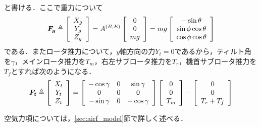 と書ける．ここで重力について
\begin{equation}
  \mbox{\boldmath $F_g$} \triangleq
  \left[
  \begin{array}{ccc}
    X_g \\
    Y_g \\
    Z_g
  \end{array}
  \right] =
  A^{(B,E)}
  \left[
  \begin{array}{ccc}
    0 \\
    0 \\
    mg
  \end{array}
  \right] = mg
  \left[
  \begin{array}{ccc}
    -\sin\theta \\
    \sin\phi\cos\theta \\
    \cos\phi\cos\theta
  \end{array}
  \right]
  \label{eq:F_g}
\end{equation}
である．またロータ推力について，$y$軸方向の力$Y_t=0$であるから，ティルト角を$\gamma$，メインロータ推力を$T_m$，右左サブロータ推力を$T_r$，機首サブロータ推力を$T_f$とすれば次のようになる．
\begin{equation}
  \mbox{\boldmath $F_t$} \triangleq
  \left[
    \begin{array}{ccc}
      X_t \\
      Y_t \\
      Z_t
    \end{array}
  \right] =
  \left[
    \begin{array}{ccc}
      -\cos\gamma & 0 & \sin\gamma \\
      0 & 0 & 0 \\
      -\sin\gamma & 0 & -\cos\gamma
    \end{array}
  \right]
  \left[
    \begin{array}{ccc}
      0 \\
      0 \\
      T_m
    \end{array}
  \right] -
  \left[
    \begin{array}{ccc}
      0 \\
      0 \\
      T_r + T_f
    \end{array}
  \right]
  \label{eq:F_t}
\end{equation}

空気力項については，\ref{sec:airf_model}節で詳しく述べる．

